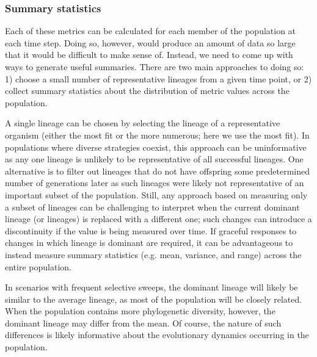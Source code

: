 \documentclass[letterpaper]{article}
\begin{document}
\subsubsection{Summary statistics}

Each of these metrics can be calculated for each member of the population at each time step. Doing so, however, would produce an amount of data so large that it would be difficult to make sense of. Instead, we need to come up with ways to generate useful summaries. There are two main approaches to doing so: 1) choose a small number of representative lineages from a given time point, or 2) collect summary statistics about the distribution of metric values across the population.

A single lineage can be chosen by selecting the lineage of %
a representative
organism (either the most fit or the more numerous; here we use the most fit). In populations where diverse strategies coexist, this approach can be uninformative as any one lineage is unlikely to be representative of all successful lineages. One alternative %
is to filter out lineages that do not have offspring some predetermined number of generations later as such lineages were likely not representative of an important subset of the population. Still, any approach based on measuring only a subset of lineages can be challenging to interpret when the current dominant lineage (or lineages) is replaced with a different one; such changes can introduce a discontinuity if the value is being measured over time. If graceful responses to changes in which lineage is dominant are required, it can be advantageous to instead measure summary statistics (e.g. mean, variance, and range) across the entire population. 

In scenarios with frequent selective sweeps, the dominant lineage will likely be similar to the average lineage,
as most of the population will be closely related. When the population contains more phylogenetic diversity, however, %
the dominant lineage may differ from the mean. Of course, the nature of such differences is likely informative about the evolutionary dynamics occurring in the population. 
\end{document}
